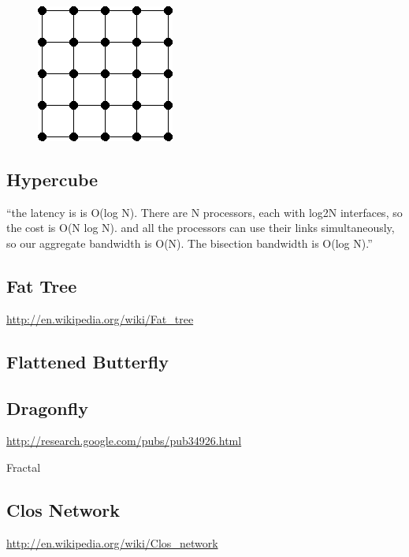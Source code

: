 \documentclass[pdftex]{article}
\begin{document}
\begin{figure}[h!]
\begin{center}
 \includegraphics[scale=.5]{pictures/mesh}
\end{center}
\end{figure}



\subsection{Hypercube}

``the latency is is O(log N). There are N processors, each with log2N interfaces, so the cost is O(N log N). and all the processors can use their links simultaneously, so our aggregate bandwidth is O(N). The bisection bandwidth is O(log N).''

\subsection{Fat Tree}

\href{http://en.wikipedia.org/wiki/Fat_tree}{http://en.wikipedia.org/wiki/Fat\_tree}

\subsection{Flattened Butterfly}

\subsection{Dragonfly}

\href{http://research.google.com/pubs/pub34926.html}{http://research.google.com/pubs/pub34926.html}

Fractal

\subsection{Clos Network}

\href{http://en.wikipedia.org/wiki/Clos_network}{http://en.wikipedia.org/wiki/Clos\_network}
\end{document}
